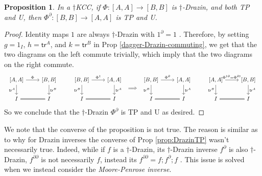 \documentclass[submission,copyright,creativecommons]{eptcs}
\newtheorem{proposition}[observation]{Proposition}
\begin{document}
\begin{proposition}\label{dag-Drazin-TP} In a $\dagger$KCC, if $\Phi: {[A,A]} \to {[B,B]}$ is $\dagger$-Drazin, and both TP and U, then $\Phi^\partial: {[B,B]} \to {[A,A]}$ is TP and U. 
\end{proposition}
\begin{proof} Identity maps $1$ are always $\dagger$-Drazin with $1^\partial = 1$ \cite[Lem 2.5]{cockett2025dagger}. Therefore, by setting $g=1_I$, $h=\mathsf{tr}^A$, and $k=\mathsf{tr}^B$ in Prop \ref{dagger-Drazin-commuting}, we get that the two diagrams on the left commute trivially, which imply that the two diagrams on the right commute. 
    \[ \begin{array}[c]{c} \begin{tikzcd}
	{[A,A]} & {[B,B]} & {[B,B]} & {[A,A]} \\
	I & I & I & I
	\arrow["\Phi", from=1-1, to=1-2]
	\arrow["{\mathsf{tr}^A}"', from=1-1, to=2-1]
	\arrow["{\mathsf{tr}^B}", from=1-2, to=2-2]
	\arrow["{{\Phi^\dagger}}", from=1-3, to=1-4]
	\arrow["{\mathsf{tr}^B}"', from=1-3, to=2-3]
	\arrow["{\mathsf{tr}^A}", from=1-4, to=2-4]
	\arrow[from=2-1, to=2-2, equal]
	\arrow[from=2-3, to=2-4, equal]
\end{tikzcd} \end{array} \Longrightarrow \begin{array}[c]{c} \begin{tikzcd}
	{[B,B]} & {[A,A]} & {[A,A]} & {[B,B]} \\
	I & I & I & I
	\arrow["{\Phi^\partial}", from=1-1, to=1-2]
	\arrow["{\mathsf{tr}^B}"', from=1-1, to=2-1]
	\arrow["{\mathsf{tr}^A}", from=1-2, to=2-2]
	\arrow["{\Phi^{\dagger\partial}= \Phi^{\partial\dagger}}", from=1-3, to=1-4]
	\arrow["{\mathsf{tr}^B}"', from=1-3, to=2-3]
	\arrow["{\mathsf{tr}^A}", from=1-4, to=2-4]
	\arrow[from=2-1, to=2-2, equal]
	\arrow[from=2-3, to=2-4, equal]
\end{tikzcd} \end{array} \]
So we conclude that the $\dagger$-Drazin $\Phi^\partial$ is TP and U as desired. 
\end{proof}

We note that the converse of the proposition is not true. The reason is similar as to why for Drazin inverses the converse of Prop \ref{prop:DrazinTP} wasn't necessarily true. Indeed, while if $f$ is a $\dagger$-Drazin, its $\dagger$-Drazin inverse $f^\partial$ is also $\dagger$-Drazin, $f^{\partial \partial}$ is not necessarily $f$, instead its $f^{\partial \partial}= f;f^\partial;f$ \cite[Prop 2.6.(iv)]{cockett2025dagger}. This issue is solved when we instead consider the \textit{Moore-Penrose inverse}.  
\end{document}
